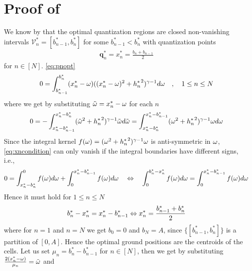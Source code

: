 \documentclass[smallabstract,smallcaptions]{dccpaper}
\renewcommand{\vp}{\mathbf q}
\newcommand{\Vor}{\ensuremath{\mathcal{V}}}         %
\begin{document}
\section{Proof of }\label{sec:proof_theorem} 
  We know by  that the optimal quantization regions are closed non-vanishing
  intervals $\Vor_n^*=[b_{n-1}^*,b_n^*]$ for some $b^*_{n-1}<b_n^*$ with quantization points
  \begin{align}
   \vp_n^*= x_n^*=\frac{b_n+b_{n-1}}{2}\label{eq:xnoptimal}
  \end{align}
  for $n\in[N]$.
  \eqref{eq:pnopt} %
  \begin{align}
    0 = \int^{b^*_n}_{b_{n-1}^*} (x_n^*-\omega) ((x_n^*-\omega)^2+{h^{*}_n}^2)^{\gamma-1}d\omega \quad,\quad 1\leq n\leq
    N\label{eq:vornx_diffh}
  \end{align}
  where we get by substituting ${  \tilde{\omega} }=x_n^*-\omega$ for each $n$ 
  \begin{align}
    0=-\int_{x_n^*-b^*_{n-1}}^{x^*_n-b^*_{n}} ({  \tilde{\omega} }^2+{h^{*}_n}^2)^{\gamma-1}{  \tilde{\omega} } d{  \tilde{\omega} } 
    =\int_{x_n^*-b^*_{n}}^{x_n^*-b^*_{n-1}} (\omega^2+{h^{*}_n}^2)^{\gamma-1}\omega d\omega\label{eq:xncondition}
  \end{align}
  Since the integral kernel $f(\omega)=(\omega^2+{h^{*}_n}^2)^{\gamma-1}\omega$ is  anti-symmetric in $\omega$,
  \eqref{eq:xncondition} can only vanish if the integral boundaries have different signs, i.e.,
  \begin{align}
    0= \int_{x_n^*-b_{n}^*}^0 f(\omega)d\omega + \int_0^{x_n^*-b_{n-1}^*} f(\omega)d\omega 
    \quad    \Leftrightarrow \quad
        \int_0^{b^*_n-x_n^*} f(\omega)d\omega = \int_0^{x_n^*-b^*_{n-1}}f(\omega)d\omega 
        \notag
  \end{align}
  Hence it must hold  for $1\leq n\leq N$
  \begin{align}
    b^*_{n} -{x^{*}_n}={x^{*}_n}-b^*_{n-1} \Leftrightarrow  {\ensuremath{x^{*}}_n}=\frac{b_{n-1}^*+b_{n}^*}{2}\label{eq:bnoptimal}
  \end{align}
  where for $n=1$ and $n=N$ we get $b_0=0$ and $b_N=A$, since $\{[b^*_{n-1},b_n^*]\}$ is a partition of $[0,A]$. Hence
  the optimal ground positions are the centroids of the cells. 
  \fi
  Let us set $\mu_n=b_n^*-b_{n-1}^*$ for $n\in[N]$, then we get by substituting $\frac{2(x_n^*-\omega)}{\mu_n}={  \tilde{\omega} }$ and
\end{document}
